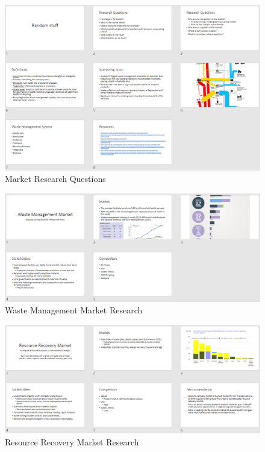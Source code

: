 \documentclass[11pt, a4, nocenter, margin=150mm]{article}
\begin{document}
\begin{appendices}
	\begin{figure}[h!]
		\centering
		\includegraphics[width=\textwidth]{week4/business_team_research.png}
		\caption{Market Research Questions}
		\label{fig:business_research}
	\end{figure}

	\begin{figure}[h!]
		\centering
		\includegraphics[width=\textwidth]{week4/business_research_waste_management.png}
		\caption{Waste Management Market Research}
		\label{fig:waste_management}
	\end{figure}

	\begin{figure}[h!]
		\centering
		\includegraphics[width=\textwidth]{week4/business_research_resource_recovery.png}
		\caption{Resource Recovery Market Research}
		\label{fig:resource_recovery}
	\end{figure}


\end{appendices}
\end{document}

